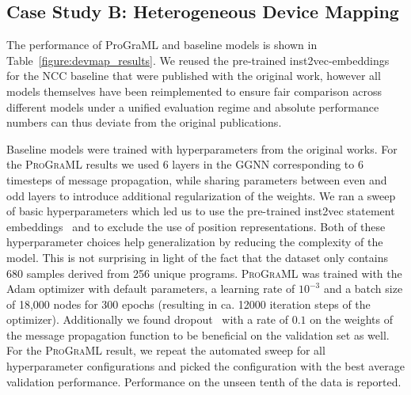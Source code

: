 \begin{table}
  
  \caption{%
    Confusion matrices for compiler analyses using
    \textsc{ProGraML}. Rows denote true negative ($T_-$) and true
    positive ($T_+$), columns denote predicted negative ($P_-$) and
    predicted positive ($P_+$). The value of a cell is the ratio of
    per-vertex model outputs of this type, e.g. $T_-P_+$ is the ratio
    of false positives.%
  }
  \label{tab:confusion_matrices}
\end{table}


\subsection{Case Study B: Heterogeneous Device Mapping}

The performance of ProGraML and baseline models is shown in
Table~\ref{figure:devmap_results}. We reused the pre-trained
inst2vec-embeddings for the NCC baseline that were published with the
original work, however all models themselves have been reimplemented
to ensure fair comparison across different models under a unified
evaluation regime and absolute performance numbers can thus deviate
from the original publications.

Baseline models were trained with hyperparameters from the original
works. For the \textsc{ProGraML} results we used 6 layers in the GGNN
corresponding to 6 timesteps of message propagation, while sharing
parameters between even and odd layers to introduce additional
regularization of the weights. We ran a sweep of basic hyperparameters
which led us to use the pre-trained inst2vec statement
embeddings~\cite{Ben-nun2018} and to exclude the use of position
representations. Both of these hyperparameter choices help
generalization by reducing the complexity of the model. This is not
surprising in light of the fact that the dataset only contains 680
samples derived from 256 unique programs. \textsc{ProGraML} was
trained with the Adam optimizer with default parameters, a learning
rate of $10^{-3}$ and a batch size of 18,000 nodes for 300 epochs
(resulting in ca. 12000 iteration steps of the
optimizer). Additionally we found dropout~\cite{Srivastava2014} with a
rate of $0.1$ on the weights of the message propagation function to be
beneficial on the validation set as well. For the \textsc{ProGraML}
result, we repeat the automated sweep for all hyperparameter
configurations and picked the configuration with the best average
validation performance. Performance on the unseen tenth of the data is
reported.

